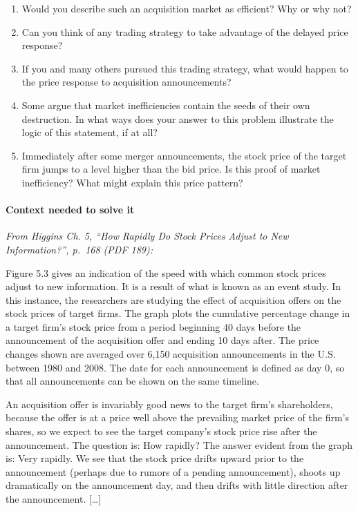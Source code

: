 \documentclass[11pt,a4paper]{article}
\begin{document}
\begin{enumerate}
\def\labelenumi{\alph{enumi}.}
\item
  Would you describe such an acquisition market as efficient? Why or why not?
\item
  Can you think of any trading strategy to take advantage of the delayed price response?
\item
  If you and many others pursued this trading strategy, what would happen to the price response to
  acquisition announcements?
\item
  Some argue that market inefficiencies contain the seeds of their own destruction. In what ways
  does your answer to this problem illustrate the logic of this statement, if at all?
\item
  Immediately after some merger announcements, the stock price of the target firm jumps to a level
  higher than the bid price. Is this proof of market inefficiency? What might explain this price
  pattern?
\end{enumerate}

\paragraph{Context needed to solve it}

\emph{From Higgins Ch. 5, ``How Rapidly Do Stock Prices Adjust to New Information?'', p.~168 (PDF
189):}

Figure 5.3 gives an indication of the speed with which common stock prices adjust to new
information. It is a result of what is known as an event study. In this instance, the researchers
are studying the effect of acquisition offers on the stock prices of target firms. The graph plots
the cumulative percentage change in a target firm's stock price from a period beginning 40 days
before the announcement of the acquisition offer and ending 10 days after. The price changes shown
are averaged over 6,150 acquisition announcements in the U.S. between 1980 and 2008. The date for
each announcement is defined as day 0, so that all announcements can be shown on the same timeline.

An acquisition offer is invariably good news to the target firm's shareholders, because the offer is
at a price well above the prevailing market price of the firm's shares, so we expect to see the
target company's stock price rise after the announcement. The question is: How rapidly? The answer
evident from the graph is: Very rapidly. We see that the stock price drifts upward prior to the
announcement (perhaps due to rumors of a pending announcement), shoots up dramatically on the
announcement day, and then drifts with little direction after the announcement. {[}\ldots{]}
\end{document}
